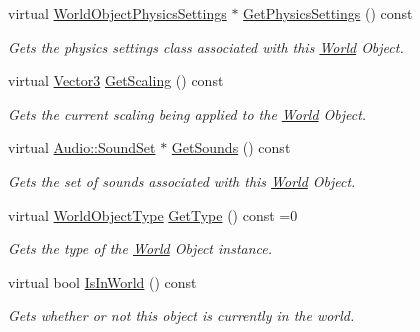 \begin{DoxyCompactItemize}
virtual \hyperlink{classMezzanine_1_1WorldObjectPhysicsSettings}{WorldObjectPhysicsSettings} $\ast$ \hyperlink{classMezzanine_1_1WorldObject_ad845988a6ff31d0e7cea45d6a45bd6c1}{GetPhysicsSettings} () const 
\begin{DoxyCompactList}\small\item\em Gets the physics settings class associated with this \hyperlink{classMezzanine_1_1World}{World} Object. \item\end{DoxyCompactList}\item 
virtual \hyperlink{classMezzanine_1_1Vector3}{Vector3} \hyperlink{classMezzanine_1_1WorldObject_acfb7a99466bc0b5b5fb914983799b2b6}{GetScaling} () const 
\begin{DoxyCompactList}\small\item\em Gets the current scaling being applied to the \hyperlink{classMezzanine_1_1World}{World} Object. \item\end{DoxyCompactList}\item 
virtual \hyperlink{classMezzanine_1_1Audio_1_1SoundSet}{Audio::SoundSet} $\ast$ \hyperlink{classMezzanine_1_1WorldObject_a91408939a400205f41da74129dd82ff2}{GetSounds} () const 
\begin{DoxyCompactList}\small\item\em Gets the set of sounds associated with this \hyperlink{classMezzanine_1_1World}{World} Object. \item\end{DoxyCompactList}\item 
virtual \hyperlink{namespaceMezzanine_a30335416fc857844e8360c84d1d1b56c}{WorldObjectType} \hyperlink{classMezzanine_1_1WorldObject_a88b76eaad3ea97b3540e5f23cbc50f73}{GetType} () const =0
\begin{DoxyCompactList}\small\item\em Gets the type of the \hyperlink{classMezzanine_1_1World}{World} Object instance. \item\end{DoxyCompactList}\item 
virtual bool \hyperlink{classMezzanine_1_1WorldObject_a2e773e73a7a190ad56d2afedeeeb8e87}{IsInWorld} () const 
\begin{DoxyCompactList}\small\item\em Gets whether or not this object is currently in the world. \item\end{DoxyCompactList}\item 

\end{DoxyCompactItemize}
